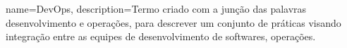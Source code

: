 {
    name=DevOps,
    description={Termo criado com a junção das palavras desenvolvimento e operações, para descrever um conjunto de práticas visando integração entre as equipes de desenvolvimento de softwares, operações.}
}

